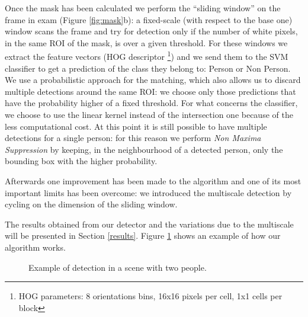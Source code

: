 \documentclass[a4paper,letterpaper, 11pt, onecolumn]{article} %
\begin{document}
Once the mask has been calculated we perform the ``sliding window'' on the frame in exam (Figure \ref{fig:mask}b): a fixed-scale (with respect to the base one) window scans the frame and try for detection only if the number of white pixels, in the same ROI of the mask, is over a given threshold. For these windows we extract the feature vectors (HOG descriptor \footnote{HOG parameters: 8 orientations bins, 16x16 pixels per cell, 1x1 cells per block}) and we send them to the SVM classifier to get a prediction of the class they belong to: Person or Non Person. We use a probabilistic approach for the matching, which also allows us to discard multiple detections around the same ROI: we choose only those predictions that have the probability higher of a fixed threshold. For what concerns the classifier, we choose to use the linear kernel instead of the intersection one because of the less computational cost. At this point it is still possible to have multiple detections for a single person: for this reason we perform \emph{Non Maxima Suppression} by keeping, in the neighbourhood  of a detected person, only the bounding box with the higher probability.

Afterwards one improvement has been made to the algorithm and one of its most important limits has been overcome: we introduced the multiscale detection by cycling on the dimension of the sliding window. 

The results obtained from our detector and the variations due to the multiscale will be presented in Section \ref{results}. Figure \ref{fig:algorithm detection} shows an example of how our algorithm works.
\
\begin{figure}[h!]
\centering
{}

\caption{Example of detection in a scene with two people.}
\label{fig:algorithm detection}
\end{figure}
\pagebreak
\end{document}
